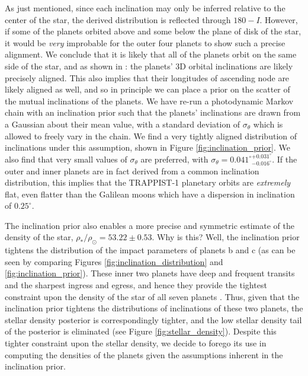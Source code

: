 \documentclass[twocolumn]{aastex63}
\begin{document}
As just mentioned, since each inclination may only be inferred relative to the center of
the star, the derived distribution is reflected through $180-I$.
However, if some of the planets orbited above and some below the plane of disk
of the star, it would be {\it very} improbable for the outer four planets to show
such a precise alignment.  We conclude that it is likely that all of the planets orbit on
the same side of the star, and as shown in \citet{Luger2017b}: the planets'
3D orbital inclinations are likely precisely aligned.   This also implies
that their longitudes of ascending node are likely aligned as well, and
so in principle we can place a prior on the scatter of the mutual inclinations
of the planets.  We have re-run a photodynamic Markov chain with an inclination prior such
that the planets' inclinations are drawn from a Gaussian about their mean value,
with a standard deviation of $\sigma_\theta$ which is allowed to freely vary in
the chain.  We find a very tightly aligned distribution of inclinations under
this assumption, shown in Figure \ref{fig:inclination_prior}.  We also find that
very small values of $\sigma_\theta$ are preferred, with $ \sigma_\theta = {0.041^\circ}_{-0.016^\circ}^{+0.031^\circ} $.
If the outer and inner planets are in fact derived from a common inclination
distribution, this implies that the TRAPPIST-1 planetary orbits are {\it extremely}
flat, even flatter than the Galilean moons which have a dispersion in inclination of
$0.25^\circ$.

The inclination prior also enables a more precise and symmetric
estimate of the density of the star, $\rho_*/\rho_\odot {=} 53.22{\pm} 0.53$.  Why is this?  Well, the
inclination prior tightens the distribution of the impact parameters of planets b
and c (as can be seen by comparing Figures \ref{fig:inclination_distribution} and
\ref{fig:inclination_prior}).  These inner two planets have deep and frequent
transits and the sharpest ingress and egress, and hence they provide the tightest
constraint upon the density of the star of all seven planets \citep{Ducrot2020}.
Thus, given that the inclination prior tightens the distributions of inclinations
of these two planets, the stellar density posterior is correspondingly tighter, and
the low stellar density tail of the posterior is eliminated (see Figure \ref{fig:stellar_density}).  Despite this tighter
constraint upon the stellar density, we decide to forego its use in computing the
densities of the planets given the assumptions inherent in the inclination prior.
\end{document}
